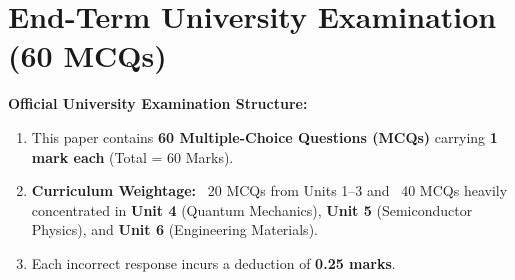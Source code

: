\section{End-Term University Examination (60 MCQs)}


\noindent
\textbf{Official University Examination Structure:}
\begin{enumerate}[topsep=2pt,itemsep=1pt]
    \item This paper contains \textbf{60 Multiple-Choice Questions (MCQs)} carrying \textbf{1 mark each} (Total = 60 Marks).
    \item \textbf{Curriculum Weightage:} ~20 MCQs from Units 1--3 and ~40 MCQs heavily concentrated in \textbf{Unit 4} (Quantum Mechanics), \textbf{Unit 5} (Semiconductor Physics), and \textbf{Unit 6} (Engineering Materials).
    \item Each incorrect response incurs a deduction of \textbf{0.25 marks}.
\end{enumerate}
\vspace{3mm}

